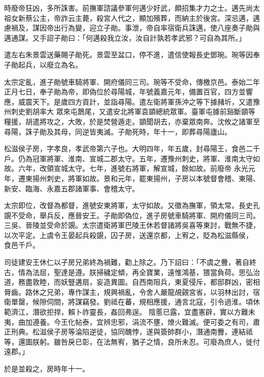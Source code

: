 \begin{pinyinscope}
 時廢帝狂凶，多所誅害。前撫軍諮議參軍何邁少好武，頗招集才力之士。邁先尚太祖女新蔡公主，帝詐云主薨，殺宮人代之，顯加殯葬，而納主於後宮。深忌邁，邁慮禍及，謀因帝出行為變，迎立子勛。事泄，帝自率宿衛兵誅邁，使八座奏子勛與
 邁通謀。又手詔子勛曰：「何邁殺我立汝，汝自計孰若孝武邪？可自為其所。」



 遣左右朱景雲送藥賜子勛死。景雲至盆口，停不進，遣信使報長史鄧琬。琬等因奉子勛起兵，以廢立為名。



 太宗定亂，進子勛號車騎將軍、開府儀同三司。琬等不受命，傳檄京邑。泰始二年正月七日，奉子勛為帝，即偽位於尋陽城，年號義嘉元年，備置百官，四方並響應，威震天下。是歲四方貢計，並詣尋陽。遣左衛將軍孫沖之等下據赭圻，又遣豫州刺史劉胡率大
 眾來屯鵲尾，又遣安北將軍袁顗總統眾軍。臺軍屯據前谿斷顗等糧援，胡遣將攻之，大敗，於是焚營遁走。顗聞胡去，亦棄眾南奔。沈攸之諸軍至尋陽，誅子勛及其母，同逆皆夷滅。子勛死時，年十一，即葬尋陽廬山。



 松滋侯子房，字孝良，孝武帝第六子也。大明四年，年五歲，封尋陽王，食邑二千戶。仍為冠軍將軍、淮南、宣城二郡太守。五年，遷豫州刺史，將軍、淮南太守如故。六年，改領宣城太守。七年，進號右將軍，解宣城，餘如故。前廢帝
 永光元年，遷東揚州刺史，將軍如故。景和元年，罷東揚州，子房以本號督會稽、東陽、新安、臨海、永嘉五郡諸軍事、會稽太守。



 太宗即位，改督為都督，進號安東將軍，太守如故。又徵為撫軍，領太常。長史孔覬不受命，舉兵反，應晉安王。子勛即偽位，進子房號車騎將軍、開府儀同三司。三吳、晉陵並受命於覬。太宗遣衛將軍巴陵王休若督諸將吳喜等東討，戰無不捷，以次平定。上虞令王晏起兵殺覬，囚子房，送還京都，上宥之，貶為松滋縣侯，
 食邑千戶。



 司徒建安王休仁以子房兄弟終為禍難，勸上除之。乃下詔曰：「不虞之釁，著自終古，情為法屈，聖達是遵。朕掃穢定傾，再全寶業，遠惟鴻基，猥當負荷。思弘治道，務盡敦睦，而妖豎遘扇，妄造異圖。自西南阻兵，東夏侵斥，都邸群凶，密相脣齒。路休之兄弟，專作謀主，規興禍亂，令舍人嚴龍覘覦宮省，以羽林出討，宿衛單罄，候隙伺間，將謀竊發。劉祗在蕃，規相應援，通言北寇，引令過淮。頃休範濟江，潛欲拒捍，賴卜祚靈長，姦回弗逞。
 陰慝已露，宜盡憲辟，實以方難未夷，曲加遵養。今王化帖泰，宜辨忠邪，涓流不壅，燎火難滅。便可委之有司，肅正刑典。松滋侯子房等淪陷逆徒，協同醜悖，遂與簽帥群小，潛通南釁，連結祗等，還圖朕躬。雖咎戾已彰，在法無宥，猶子之情，良所未忍。可廢為庶人，徙付遠郡。」



 於是並殺之，房時年十一。




\end{pinyinscope}
